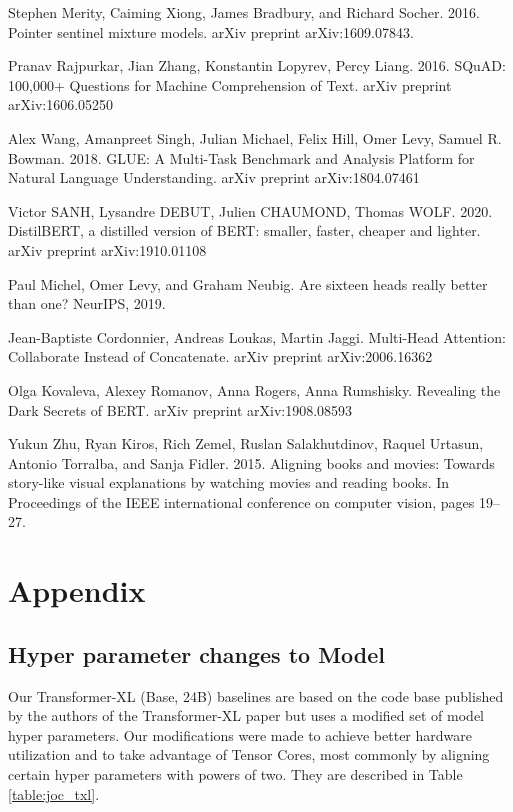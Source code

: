 \documentclass{article}
\begin{document}
\begin{thebibliography}{1}
Stephen Merity, Caiming Xiong, James Bradbury, and Richard Socher. 2016. Pointer sentinel mixture models. arXiv preprint arXiv:1609.07843.

Pranav Rajpurkar, Jian Zhang, Konstantin Lopyrev, Percy Liang. 2016. SQuAD: 100,000+ Questions for Machine Comprehension of Text. arXiv preprint arXiv:1606.05250

Alex Wang, Amanpreet Singh, Julian Michael, Felix Hill, Omer Levy, Samuel R. Bowman. 2018. GLUE: A Multi-Task Benchmark and Analysis Platform for Natural Language Understanding. arXiv preprint arXiv:1804.07461

Victor SANH, Lysandre DEBUT, Julien CHAUMOND, Thomas WOLF. 2020. DistilBERT, a distilled version of BERT: smaller,
faster, cheaper and lighter. arXiv preprint arXiv:1910.01108

Paul Michel, Omer Levy, and Graham Neubig. Are sixteen heads really better than one? NeurIPS, 2019.

Jean-Baptiste Cordonnier, Andreas Loukas, Martin Jaggi. Multi-Head Attention: Collaborate Instead of Concatenate. arXiv preprint arXiv:2006.16362

Olga Kovaleva, Alexey Romanov, Anna Rogers, Anna Rumshisky. Revealing the Dark Secrets of BERT. arXiv preprint arXiv:1908.08593

Yukun Zhu, Ryan Kiros, Rich Zemel, Ruslan Salakhutdinov, Raquel Urtasun, Antonio Torralba, and Sanja Fidler. 2015. Aligning books and movies: Towards story-like visual explanations by watching movies and reading books. In Proceedings of the IEEE international conference on computer vision, pages 19–27.

\end{thebibliography}
\appendix
\section{Appendix}

\subsection{Hyper parameter changes to Model}

Our Transformer-XL (Base, 24B) baselines are based on the code base published by the authors of the Transformer-XL paper but uses a modified set of model hyper parameters. Our modifications were made to achieve better hardware utilization and to take advantage of Tensor Cores, most commonly by aligning certain hyper parameters with powers of two. They are described in Table \ref{table:joc_txl}. 
\end{document}
